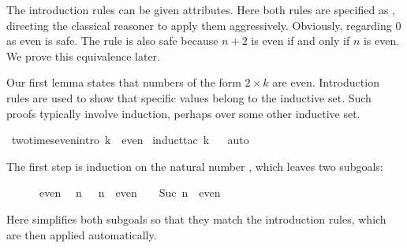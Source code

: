 \begin{isabellebody}
\begin{isamarkuptext}
The introduction rules can be given attributes.  Here
both rules are specified as ,%
directing the classical reasoner to 
apply them aggressively. Obviously, regarding 0 as even is safe.  The
 rule is also safe because $n+2$ is even if and only if $n$ is
even.  We prove this equivalence later.%
\end{isamarkuptext}%
\isamarkuptrue%
%
\isamarkuptrue%
%
\begin{isamarkuptext}%
Our first lemma states that numbers of the form $2\times k$ are even.
Introduction rules are used to show that specific values belong to the
inductive set.  Such proofs typically involve 
induction, perhaps over some other inductive set.%
\end{isamarkuptext}%
\isamarkuptrue%
\isamarkupfalse%
\ two{}times{}even{}intro{}{}{}\ {}{}{}k\ {}\ even{}\isanewline
%
\isadelimproof
%
\endisadelimproof
%
\isatagproof
{}\isamarkupfalse%
\ {}induct{}tac\ k{}\isanewline
\ \isamarkupfalse%
\ auto\isanewline
{}\isamarkupfalse%
%
\endisatagproof
{\isafoldproof}%
%
\isadelimproof
%
\endisadelimproof
%
\isadelimproof
%
\endisadelimproof
%
\isatagproof
%
\begin{isamarkuptxt}%
\noindent
The first step is induction on the natural number , which leaves
two subgoals:
\begin{isabelle}%
\ {}{}\ {}\ {}\ {}\ {}\ even\isanewline
\ {}{}\ {}n{}\ {}\ {}\ n\ {}\ even\ {}\ {}\ {}\ Suc\ n\ {}\ even%
\end{isabelle}
Here  simplifies both subgoals so that they match the introduction
rules, which are then applied automatically.


\end{isamarkuptxt}
\end{isabellebody}
